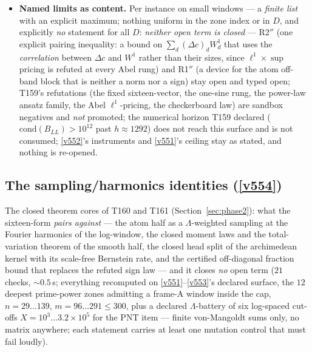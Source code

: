 \documentclass[11pt,a4paper]{article}
\begin{document}
\begin{itemize}[leftmargin=1.5em]
$\times59.9$, tracking the true $1/s$ --- the instrument reports the collapse instead of
hiding it). Parity control: $A=L_P$ \emph{is} the section of the lag vector
$(2,-1,0,\ldots)$ entrywise, and the same machinery returns $B=I$, $s=1$, every ladder
partial sum $g_K=1$ exactly constant in $K$, a zero gauge sum and lag sum $=\|x\|^2=1$
(worst $4.9\times10^{-14}$); the Dirichlet residual hits the predicted $2/\sqrt N$ to
$7.4\times10^{-5}$.
\item \textbf{Named limits as content.} Per instance on small windows --- a \emph{finite
list} with an explicit maximum; nothing uniform in the zone index or in $D$, and
explicitly \emph{no} statement for all $D$: \emph{neither open term is closed} --- R2$''$
(one explicit pairing inequality: a bound on $\sum_d(\Delta c)_d W^1_d$ that uses the
\emph{correlation} between $\Delta c$ and $W^1$ rather than their sizes, since
$\ell^1{\times}\sup$ pricing is refuted at every Abel rung) and R1$''$ (a device for the
atom off-band block that is neither a norm nor a sign) stay open and typed open; T159's
refutations (the fixed sixteen-vector, the one-sine rung, the power-law ansatz family, the
Abel $\ell^1$-pricing, the checkerboard law) are sandbox negatives and \emph{not}
promoted; the numerical horizon T159 declared ($\mathrm{cond}(B_{LL})>10^{12}$ past
$h\approx1292$) does not reach this surface and is not consumed; \vref{v552}'s
instruments and \vref{v551}'s ceiling stay as stated, and nothing is re-opened.
\end{itemize}

\subsection{The sampling/harmonics identities (\texorpdfstring{\vref{v554}}{v554})}\label{sec:v554}
The closed theorem cores of T160 and T161 (Section~\ref{sec:phase2}): what the sixteen-form
\emph{pairs against} --- the atom half as a $\Lambda$-weighted sampling at the Fourier
harmonics of the log-window, the closed moment laws and the total-variation theorem of the
smooth half, the closed head split of the archimedean kernel with its scale-free Bernstein
rate, and the certified off-diagonal fraction bound that replaces the refuted sign law ---
and it closes \emph{no} open term
 ($21$ checks, ${\sim}0.5$\,s; everything
recomputed on \vref{v551}--\vref{v553}'s declared surface, the $12$ deepest prime-power
zones admitting a frame-A window inside the cap, $n=29\ldots139$, $m=96\ldots291\le300$,
plus a declared $\Lambda$-battery of six log-spaced cut-offs $X=10^{3}\ldots3.2\times10^{5}$
for the PNT item --- finite von-Mangoldt sums only, no matrix anywhere; each statement
carries at least one mutation control that must fail loudly).
\end{document}
